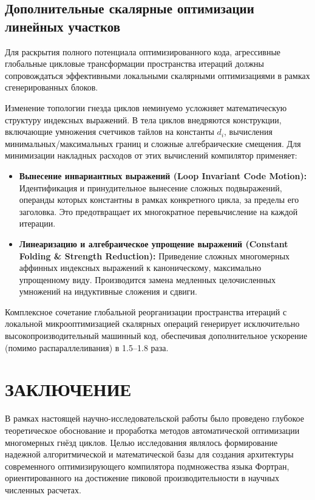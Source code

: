 \documentclass[14pt, russian]{scrartcl}
\newcommand{\anonsection}[1]{\cleardoublepage
\phantomsection
\addcontentsline{toc}{section}{\protect\numberline{}#1}
\section*{#1}\vspace*{2.5ex} %
}
\begin{document}
\subsection{Дополнительные скалярные оптимизации линейных участков}

Для раскрытия полного потенциала оптимизированного кода, агрессивные глобальные цикловые трансформации пространства итераций должны сопровождаться эффективными локальными скалярными оптимизациями в рамках сгенерированных блоков. 

Изменение топологии гнезда циклов неминуемо усложняет математическую структуру индексных выражений. В тела циклов внедряются конструкции, включающие умножения счетчиков тайлов на константы $d_i$, вычисления минимальных/максимальных границ и сложные алгебраические смещения. Для минимизации накладных расходов от этих вычислений компилятор применяет:
\begin{itemize}
    \item \textbf{Вынесение инвариантных выражений (Loop Invariant Code Motion):} Идентификация и принудительное вынесение сложных подвыражений, операнды которых константны в рамках конкретного цикла, за пределы его заголовка. Это предотвращает их многократное перевычисление на каждой итерации.
    \item \textbf{Линеаризацию и алгебраическое упрощение выражений (Constant Folding \& Strength Reduction):} Приведение сложных многомерных аффинных индексных выражений к каноническому, максимально упрощенному виду. Производится замена медленных целочисленных умножений на индуктивные сложения и сдвиги.
\end{itemize}
Комплексное сочетание глобальной реорганизации пространства итераций с локальной микрооптимизацией скалярных операций генерирует исключительно высокопроизводительный машинный код, обеспечивая дополнительное ускорение (помимо распараллеливания) в 1.5--1.8 раза.

\anonsection{ЗАКЛЮЧЕНИЕ}

В рамках настоящей научно-исследовательской работы было проведено глубокое теоретическое обоснование и проработка методов автоматической оптимизации многомерных гнёзд циклов. Целью исследования являлось формирование надежной алгоритмической и математической базы для создания архитектуры современного оптимизирующего компилятора подмножества языка Фортран, ориентированного на достижение пиковой производительности в научных численных расчетах.
\end{document}
